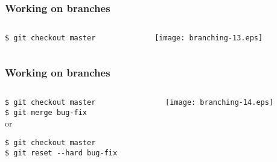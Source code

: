 \documentclass[english]{beamer}
\newcommand{\CMD}[1]{%
\texttt{\textcolor{code-green}{#1}}%
}
\newcommand{\faint}[1]{%
\textcolor{code-gray}{#1}%
}
\begin{document}
\begin{frame}
\frametitle{Working on branches}

\begin{columns}[t]
        \begin{column}[T]{.5\textwidth}
                {\small
                \CMD{\$ git checkout master} \\
                }
        \end{column}
        \begin{column}[T]{.5\textwidth}
                \texttt{[image: branching-13.eps]}
        \end{column}
\end{columns}
\end{frame}

\begin{frame}
\frametitle{Working on branches}

\begin{columns}[t]
        \begin{column}[T]{.5\textwidth}
                {\small
                \CMD{\$ git checkout master} \\

                \CMD{\$ git merge bug-fix} \\

                \pause{}
                \vspace{\baselineskip}
                \faint{or}
                \vspace{\baselineskip}

                \CMD{\$ git checkout master} \\
                \CMD{\$ git reset {-}-hard bug-fix} \\
                }
        \end{column}
        \begin{column}[T]{.5\textwidth}
                \texttt{[image: branching-14.eps]}
        \end{column}
\end{columns}
\end{frame}
\end{document}
